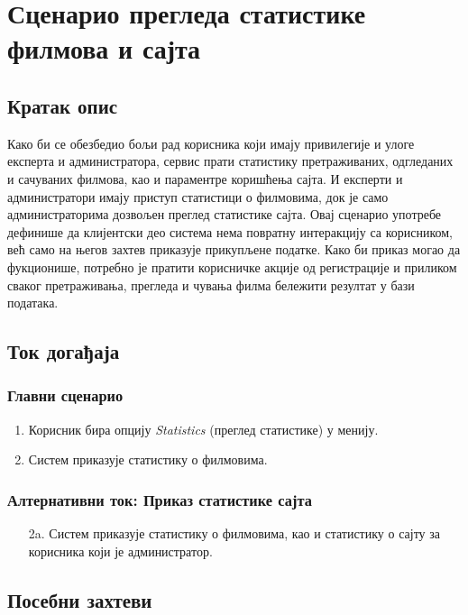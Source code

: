 \section{Сценарио прегледа статистике филмова и сајта}

\subsection{Кратак опис}

Како би се обезбедио бољи рад корисника који имају привилегије и улоге експерта и администратора,
сервис прати статистику претраживаних, одгледаних и сачуваних филмова, као и параментре коришћења
сајта. И експерти и администратори имају приступ статистици о филмовима, док је само администраторима
дозвољен преглед статистике сајта. Овај сценарио употребе дефинише да клијентски део система нема
повратну интеракцију са корисником, већ само на његов захтев приказује прикупљене податке. Како би
приказ могао да фукционише, потребно је пратити корисничке акције од регистрације и приликом сваког
претраживања, прегледа и чувања филма бележити резултат у бази података.

\subsection{Ток догађаја}

\subsubsection{Главни сценарио}

\begin{enumerate}
    \item Корисник бира опцију \textit{Statistics} (преглед статистике) у менију.
    \item Систем приказује статистику о филмовима.
\end{enumerate}

\subsubsection{Алтернативни ток: Приказ статистике сајта}

\begin{enumerate}
    \item [2a.] Систем приказује статистику о филмовима, као и статистику о сајту за корисника који
      је администратор.
\end{enumerate}

\subsection{Посебни захтеви}

